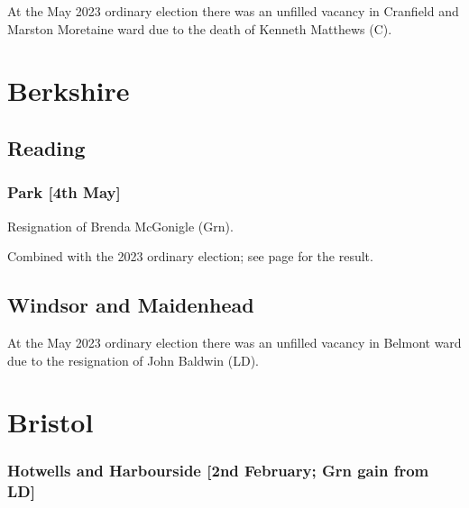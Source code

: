 \documentclass[a4paper,openany]{book}
\begin{document}
\begin{resultsiii}
At the May 2023 ordinary election there was an unfilled vacancy in Cranfield and Marston Moretaine ward due to the death of Kenneth Matthews (C).%

\section{Berkshire}

\subsection*{Reading}

\subsubsection*{Park \hspace*{\fill}\nolinebreak[1]%
	\enspace\hspace*{\fill}
	[4th May]}


Resignation of Brenda McGonigle (Grn).

Combined with the 2023 ordinary election; see page \pageref{ReadingPark} for the result.

\subsection*{Windsor and Maidenhead}

At the May 2023 ordinary election there was an unfilled vacancy in Belmont ward due to the resignation of John Baldwin (LD).%

\section{Bristol}

\subsubsection*{Hotwells and Harbourside \hspace*{\fill}\nolinebreak[1]%
	\enspace\hspace*{\fill}
	[2nd February; Grn gain from LD]}



\end{resultsiii}
\end{document}
